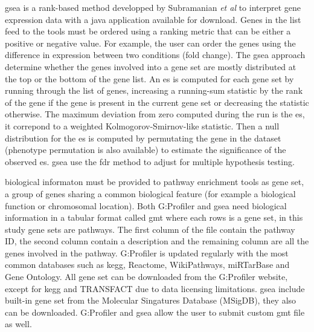 \acrfull{gsea} is a rank-based method developped by Subramanian \textit{et al} to interpret gene expression data with a java application available for download.
Genes in the list feed to the tools must be ordered using a ranking metric that can be either a positive or negative value.
For example, the user can order the genes using the difference in expression between two conditions (fold change).
The \acrshort{gsea} approach determine whether the genes involved into a gene set are mostly distributed at the top or the bottom of the gene list.
An \acrfull{es} is computed for each gene set by running through the list of genes, increasing a running-sum statistic by the rank of the gene if the gene is present in the current gene set or decreasing the statistic otherwise.
The maximum deviation from zero computed during the run is the \acrshort{es}, it correpond to a weighted Kolmogorov-Smirnov-like statistic.
Then a null distribution for the \acrshort{es} is computed by permutating the gene in the dataset (phenotype permutation is also available) to estimate the significance of the observed \acrshort{es}.
\acrshort{gsea} use the \acrshort{fdr} method to adjust for multiple hypothesis testing.

biological informaton must be provided to pathway enrichment tools as gene set, a group of genes sharing a common biological feature (for example a biological function or chromosomal location).
Both G:Profiler and \acrshort{gsea} need biological information in a tabular format called \acrfull{gmt} where each rows is a gene set, in this study gene sets are pathways.
The first column of the file contain the pathway ID, the second column contain a description and the remaining column are all the genes involved in the pathway.
G:Profiler is updated regularly with the most common databases such as \acrshort{kegg}, Reactome, WikiPathways, miRTarBase and Gene Ontology.
All gene set can be downloaded from the G:Profiler website, except for \acrshort{kegg} and TRANSFACT due to data licensing limitations.
\acrshort{gsea} include built-in gene set from the Molecular Singatures Database (MSigDB), they also can be downloaded.
G:Profiler and \acrshort{gsea} allow the user to submit custom \acrshort{gmt} file as well.

